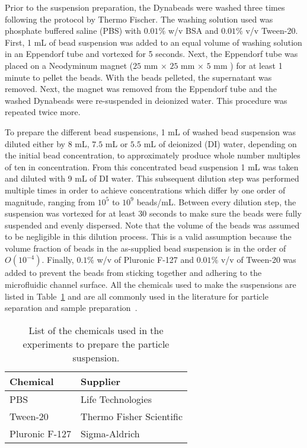Prior to the suspension preparation, the Dynabeads were washed three times following the protocol by Thermo Fischer. The washing solution used was phosphate buffered saline (PBS) with $0.01\%$ w/v BSA and $0.01\%$ v/v Tween-20. First, 1 mL of bead suspension was added to an equal volume of washing solution in an Eppendorf tube and vortexed for 5 seconds. Next, the Eppendorf tube was placed on a Neodyminum magnet ($25$ mm $\times$ $25$ mm $\times$ $5$ mm ) for at least 1 minute to pellet the beads. With the beads pelleted, the supernatant was removed. Next, the magnet was removed from the Eppendorf tube and the washed Dynabeads were re-suspended in deionized water. This procedure was repeated twice more.

To prepare the different bead suspensions, 1 mL of washed bead suspension was diluted either by $8$ mL, $7.5$ mL or $5.5$ mL of deionized (DI) water, depending on the initial bead concentration, to approximately produce whole number multiples of ten in concentration. From this concentrated bead suspension 1 mL was taken and diluted with 9 mL of DI water. This subsequent dilution step was performed multiple times in order to achieve concentrations which differ by one order of magnitude, ranging from $10^{5}$ to $10^{9}$ beads/mL. Between every dilution step, the suspension was vortexed for at least 30 seconds to make sure the beads were fully suspended and evenly dispersed. Note that the volume of the beads was assumed to be negligible in this dilution process. This is a valid assumption because the volume fraction of beads in the as-supplied bead suspension is in the order of $O(10^{-4})$. Finally, $0.1\%$ w/v of Pluronic F-127 and $0.01\%$ v/v of Tween-20 was added to prevent the beads from sticking together and adhering to the microfluidic channel surface. All the chemicals used to make the suspensions are listed in Table~\ref{tab:chemicalSuspensionMaterials} and are all commonly used in the literature for particle separation and sample preparation~\cite{Deng2002,Afshar2011,Rinklin2012,Samwer2013,Pamme2006a,Peyman2009,Tarn2013}.

\begin{table}[htb]
\begin{center}
\caption[Chemicals used in the experiments]{List of the chemicals used in the experiments to prepare the particle suspension.}
\vspace{1ex}
\label{tab:chemicalSuspensionMaterials}
\begin{tabular}{ll}
\hline
Chemical 	& Supplier\\ 
\hline
PBS 					& Life Technologies \\
Tween-20 		& Thermo Fisher Scientific\\
Pluronic F-127 	& Sigma-Aldrich \\
\hline
\end{tabular}
\end{center}
\end{table}

